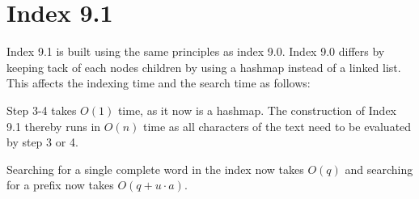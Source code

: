 \section{Index 9.1}
Index 9.1 is built using the same principles as index 9.0. Index 9.0 differs by keeping tack of each nodes children by using a hashmap instead of a linked list. This affects the indexing time and the search time as follows:

Step 3-4 takes $O(1)$ time, as it now is a hashmap. The construction of Index 9.1 thereby runs in $O(n)$ time as all characters of the text need to be evaluated by step 3 or 4.

Searching for a single complete word in the index now takes $O(q)$ and searching for a prefix now takes  $O(q + u\cdot a)$.

